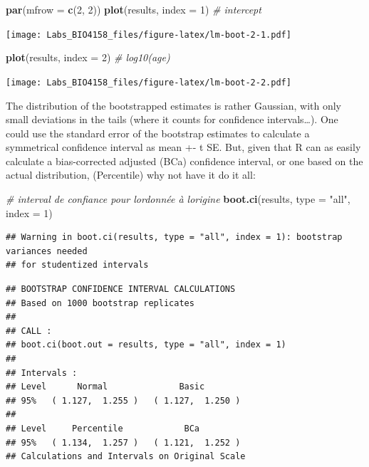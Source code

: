 \documentclass[
  12pt,
]{book}
\newenvironment{Shaded}{\begin{snugshade}}{\end{snugshade}}
\newcommand{\CommentTok}[1]{\textcolor[rgb]{0.56,0.35,0.01}{\textit{#1}}}
\newcommand{\DataTypeTok}[1]{\textcolor[rgb]{0.13,0.29,0.53}{#1}}
\newcommand{\DecValTok}[1]{\textcolor[rgb]{0.00,0.00,0.81}{#1}}
\newcommand{\KeywordTok}[1]{\textcolor[rgb]{0.13,0.29,0.53}{\textbf{#1}}}
\newcommand{\NormalTok}[1]{#1}
\newcommand{\StringTok}[1]{\textcolor[rgb]{0.31,0.60,0.02}{#1}}
\begin{document}
\begin{Shaded}
\begin{Highlighting}[]
\KeywordTok{par}\NormalTok{(}\DataTypeTok{mfrow =} \KeywordTok{c}\NormalTok{(}\DecValTok{2}\NormalTok{, }\DecValTok{2}\NormalTok{))}
\KeywordTok{plot}\NormalTok{(results, }\DataTypeTok{index =} \DecValTok{1}\NormalTok{) }\CommentTok{\# intercept}
\end{Highlighting}
\end{Shaded}

\texttt{[image: Labs\_BIO4158\_files/figure-latex/lm-boot-2-1.pdf]}

\begin{Shaded}
\begin{Highlighting}[]
\KeywordTok{plot}\NormalTok{(results, }\DataTypeTok{index =} \DecValTok{2}\NormalTok{) }\CommentTok{\# log10(age)}
\end{Highlighting}
\end{Shaded}

\texttt{[image: Labs\_BIO4158\_files/figure-latex/lm-boot-2-2.pdf]}

The distribution of the bootstrapped estimates is rather Gaussian, with only small deviations in the tails (where it counts for confidence intervals\ldots). One could use the standard error of the bootstrap estimates to calculate a symmetrical confidence interval as mean +- t SE. But, given that R can as easily calculate a bias-corrected adjusted (BCa) confidence interval, or one based on the actual distribution, (Percentile) why not have it do it all:

\begin{Shaded}
\begin{Highlighting}[]
\CommentTok{\# interval de confiance pour l\textquotesingle{}ordonnée à l\textquotesingle{}origine}
\KeywordTok{boot.ci}\NormalTok{(results, }\DataTypeTok{type =} \StringTok{"all"}\NormalTok{, }\DataTypeTok{index =} \DecValTok{1}\NormalTok{)}
\end{Highlighting}
\end{Shaded}

\begin{verbatim}
## Warning in boot.ci(results, type = "all", index = 1): bootstrap variances needed
## for studentized intervals
\end{verbatim}

\begin{verbatim}
## BOOTSTRAP CONFIDENCE INTERVAL CALCULATIONS
## Based on 1000 bootstrap replicates
## 
## CALL : 
## boot.ci(boot.out = results, type = "all", index = 1)
## 
## Intervals : 
## Level      Normal              Basic         
## 95%   ( 1.127,  1.255 )   ( 1.127,  1.250 )  
## 
## Level     Percentile            BCa          
## 95%   ( 1.134,  1.257 )   ( 1.121,  1.252 )  
## Calculations and Intervals on Original Scale
\end{verbatim}
\end{document}
